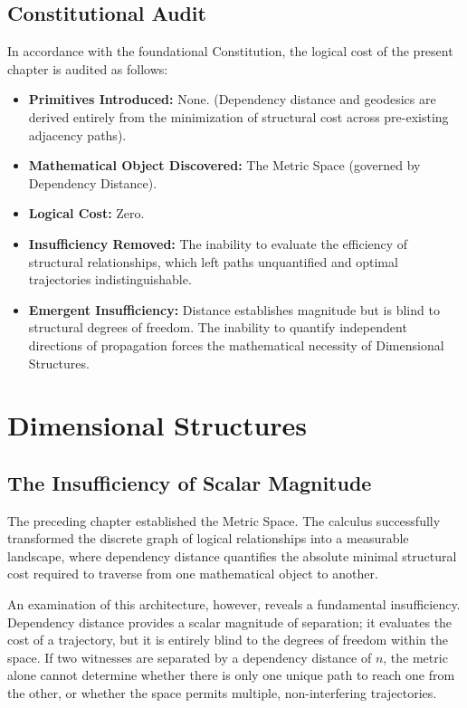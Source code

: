 \documentclass[12pt,anyside]{book}
\begin{document}
\section{Constitutional Audit}
In accordance with the foundational Constitution, the logical cost of the present chapter is audited as follows:
\begin{itemize}
    \item \textbf{Primitives Introduced:} None. (Dependency distance and geodesics are derived entirely from the minimization of structural cost across pre-existing adjacency paths).
    \item \textbf{Mathematical Object Discovered:} The Metric Space (governed by Dependency Distance).
    \item \textbf{Logical Cost:} Zero.
    \item \textbf{Insufficiency Removed:} The inability to evaluate the efficiency of structural relationships, which left paths unquantified and optimal trajectories indistinguishable.
    \item \textbf{Emergent Insufficiency:} Distance establishes magnitude but is blind to structural degrees of freedom. The inability to quantify independent directions of propagation forces the mathematical necessity of Dimensional Structures.
\end{itemize}

\chapter{Dimensional Structures}

\section{The Insufficiency of Scalar Magnitude}
The preceding chapter established the Metric Space. The calculus successfully transformed the discrete graph of logical relationships into a measurable landscape, where dependency distance quantifies the absolute minimal structural cost required to traverse from one mathematical object to another. 

An examination of this architecture, however, reveals a fundamental insufficiency. Dependency distance provides a scalar magnitude of separation; it evaluates the cost of a trajectory, but it is entirely blind to the degrees of freedom within the space. If two witnesses are separated by a dependency distance of $n$, the metric alone cannot determine whether there is only one unique path to reach one from the other, or whether the space permits multiple, non-interfering trajectories. 
\end{document}
